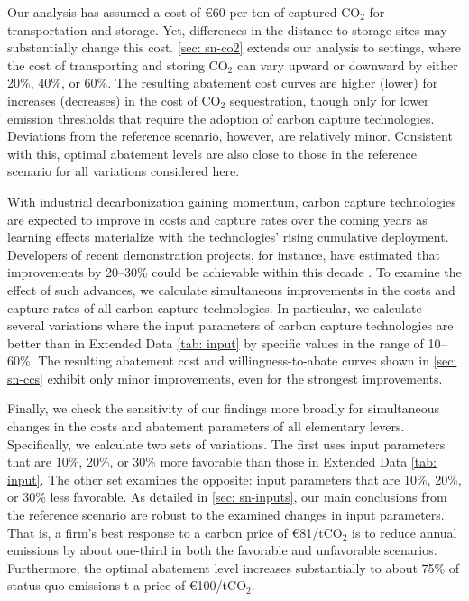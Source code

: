 \documentclass[12pt, a4paper]{article} %
\begin{document}
Our analysis has assumed a cost of \euro 60 per ton of captured CO$_2$ for transportation and storage. Yet, differences in the distance to storage sites may substantially change this cost. \ref{sec: sn-co2} extends our analysis to settings, where the cost of transporting and storing CO$_2$ can vary upward or downward by either 20\%, 40\%, or 60\%. The resulting abatement cost curves are higher (lower) for increases (decreases) in the cost of CO$_2$ sequestration, though only for lower emission thresholds that require the adoption of carbon capture technologies. Deviations from the reference scenario, however, are relatively minor. Consistent with this, optimal abatement levels are also close to those in the reference scenario for all variations considered here.

With industrial decarbonization gaining momentum, carbon capture technologies are expected to improve in costs and capture rates over the coming years as learning effects materialize with the technologies' rising cumulative deployment. Developers of recent demonstration projects, for instance, have estimated that improvements by 20--30\% could be achievable within this decade \citep{kearns2021technology}. To examine the effect of such advances, we calculate simultaneous improvements in the costs and capture rates of all carbon capture technologies. In particular, we calculate several variations where the input parameters of carbon capture technologies are better than in Extended Data \autoref{tab: input} by specific values in the range of 10--60\%. The resulting abatement cost and willingness-to-abate curves shown in \ref{sec: sn-ccs} exhibit only minor improvements, even for the strongest improvements.

Finally, we check the sensitivity of our findings more broadly for simultaneous changes in the costs and abatement parameters of all elementary levers. Specifically, we calculate two sets of variations. The first uses input parameters that are 10\%, 20\%, or 30\% more favorable than those in Extended Data \autoref{tab: input}. The other set examines the opposite: input parameters that are 10\%, 20\%, or 30\% less favorable. As detailed in \ref{sec: sn-inputs}, our main conclusions from the reference scenario are robust to the examined changes in input parameters. That is, a firm's best response to a carbon price of \euro 81/tCO$_2$ is to reduce annual emissions by about one-third in both the favorable and unfavorable scenarios. Furthermore, the optimal abatement level increases substantially to about 75\% of status quo emissions t a price of \euro 100/tCO$_2$.
\end{document}
